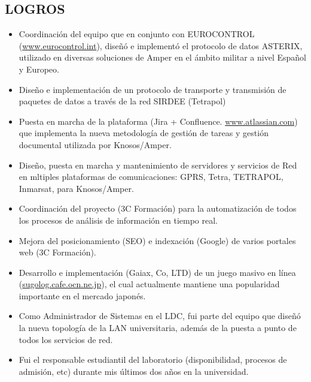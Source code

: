 \documentclass[line,margin]{res}
\begin{document}
\begin{resume}
\section{LOGROS}       
                \begin{itemize}  \itemsep 2pt %
                \item Coordinaci\'{o}n del equipo que en conjunto con 
                EUROCONTROL (\url{www.eurocontrol.int}), dise\~{n}\'{o} e 
                implement\'{o} el protocolo de datos ASTERIX, utilizado en 
                diversas soluciones de Amper en el \'{a}mbito militar a nivel 
                Espa\~{n}ol y Europeo.
                \item Dise\~{n}o e implementaci\'{o}n de un protocolo de 
                transporte y transmisi\'{o}n de paquetes de datos a trav\'{e}s 
                de la red SIRDEE (Tetrapol)
                \item Puesta en marcha de la plataforma (Jira + Confluence. 
                \url{www.atlassian.com}) que implementa la nueva metodolog\'{i}a 
                de gesti\'{o}n de tareas y gesti\'{o}n documental utilizada por 
                Knosos/Amper.
                \item Dise\~{n}o, puesta en marcha y mantenimiento de servidores 
                y servicios de Red en mltiples plataformas de comunicaciones: 
                GPRS, Tetra, TETRAPOL, Inmarsat, para Knosos/Amper.
                \item Coordinaci\'{o}n del proyecto (3C Formaci\'{o}n) para la 
                automatizaci\'{o}n de todos los procesos de an\'{a}lisis de 
                informaci\'{o}n en tiempo real.
                \item Mejora del posicionamiento (SEO) e indexaci\'{o}n (Google) 
                de varios portales web (3C Formaci\'{o}n).
                \item Desarrollo e implementaci\'{o}n (Gaiax, Co, LTD) de un 
                juego masivo en l\'{i}nea (\url{sugolog.cafe.ocn.ne.jp}), el 
                cual actualmente mantiene una popularidad importante en el 
                mercado japon\'{e}s.
                \item Como Administrador de Sistemas en el LDC, fui parte del 
                equipo que dise\~{n}\'{o} la nueva topolog\'{i}a de la LAN 
                universitaria, adem\'{a}s de la puesta a punto de todos los 
                servicios de red.
                \item Fui el responsable estudiantil del laboratorio (disponibilidad, 
                procesos de admisi\'{o}n, etc) durante mis \'{u}ltimos dos a\~{n}os en 
                la universidad. 
                \end{itemize}


\end{resume}
\end{document}
